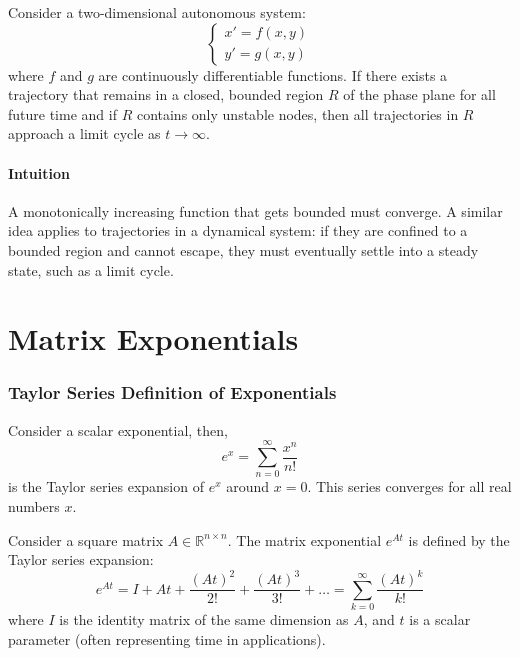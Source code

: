 \documentclass[11pt]{article}
\begin{document}
\begin{theorem}
    Consider a two-dimensional autonomous system:
    $$\begin{cases}
        x' = f(x, y) \\
        y' = g(x, y)
    \end{cases}$$
    where \( f \) and \( g \) are continuously differentiable functions. If there exists a trajectory that remains in a closed, bounded region \( R \) of the phase plane for all future time and if \( R \) contains only unstable nodes, then all trajectories in \( R \) approach a limit cycle as \( t \to \infty \).
\end{theorem}
\paragraph{Intuition} A monotonically increasing function that gets bounded must converge. A similar idea applies to trajectories in a dynamical system: if they are confined to a bounded region and cannot escape, they must eventually settle into a steady state, such as a limit cycle.

\section{Matrix Exponentials}
\begin{shaded}
\subsubsection*{Taylor Series Definition of Exponentials}
Consider a scalar exponential, then,
$$e^x = \sum_{n=0}^{\infty} \frac{x^n}{n!}$$
is the Taylor series expansion of \( e^x \) around \( x = 0 \). This series converges for all real numbers \( x \).
\end{shaded}

\begin{definition}
    Consider a square matrix \( A \in \mathbb{R}^{n \times n} \). The matrix exponential \( e^{At} \) is defined by the Taylor series expansion:
    \begin{equation}
    e^{At} = I + At + \frac{(At)^2}{2!} + \frac{(At)^3}{3!} + \ldots = \sum_{k=0}^{\infty} \frac{(At)^k}{k!}
    \end{equation}
    where \( I \) is the identity matrix of the same dimension as \( A \), and \( t \) is a scalar parameter (often representing time in applications).
\end{definition}
\end{document}
